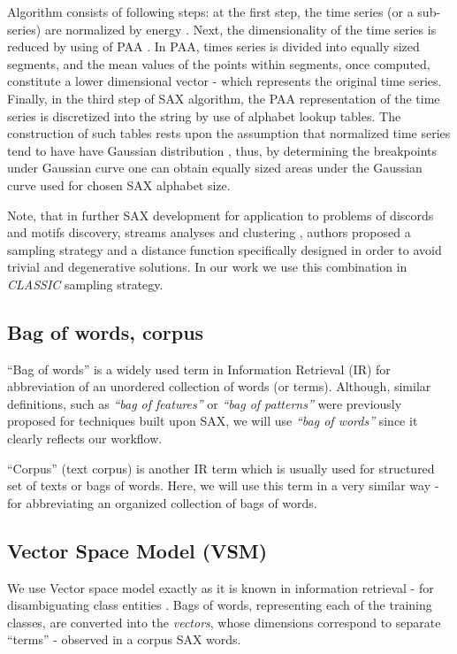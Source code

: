 \documentclass{llncs}
\begin{document}
Algorithm consists of following steps: at the first step, the time series (or a sub-series) are normalized
by energy \cite{goldin_kanellakis}. Next, the dimensionality of the time series is reduced by using 
of PAA \cite{paa}. In PAA, times series is divided into equally sized segments, and the mean values 
of the points within segments, once computed, constitute a lower dimensional vector - which 
represents the original time series. Finally, in the third step of SAX algorithm, the PAA representation 
of the time series is discretized into the string by use of alphabet lookup tables. The construction of 
such tables rests upon the assumption that normalized time series tend to have have Gaussian 
distribution \cite{larsen_marx}, thus, by determining the breakpoints under Gaussian curve one 
can obtain equally sized areas under the Gaussian curve used for chosen SAX alphabet size.

Note, that in further SAX development \cite{hot_sax} for application to problems of discords
and motifs discovery, streams analyses and clustering \cite{streaming_sax}, authors proposed a 
sampling strategy and a distance function specifically designed in order to avoid trivial and 
degenerative solutions. In our work we use this combination in \textit{CLASSIC} sampling strategy.

\subsection{Bag of words, corpus}
``Bag of words'' is a widely used term in Information Retrieval (IR) for abbreviation of an
unordered collection of words (or terms). Although, similar definitions, such as \textit{``bag of
features''} or \textit{``bag of patterns''} \cite{bag_patterns} were previously proposed for
techniques built upon SAX, we will use \textit{``bag of words''} since it clearly reflects our
workflow. 

``Corpus'' (text corpus) is another IR term which is usually used for structured set of texts or
bags of words. Here, we will use this term in a very similar way - for abbreviating an organized
collection of bags of words. 

\subsection{Vector Space Model (VSM)}
We use Vector space model exactly as it is known in information retrieval - for disambiguating class
entities \cite{salton}. Bags of words, representing each of the training classes, are converted into
the \textit{vectors}, whose dimensions correspond to separate “terms” - observed in a corpus SAX
words. 
\end{document}
